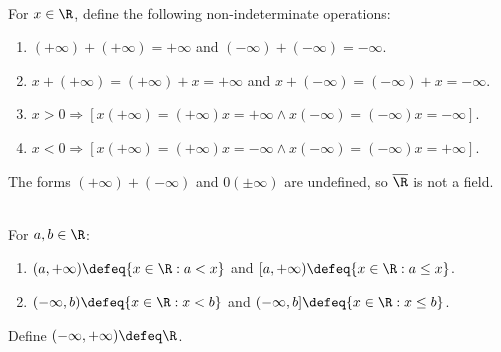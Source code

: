 \begin{definition} \label{def:extended-real-arithmetic-conventions} \\
For $x\in\R$, define the following non-indeterminate operations:
\begin{enumerate}[label=(\roman*)]
\setlength{\itemsep}{0pt}
\item $(+\infty)+(+\infty)=+\infty$ and $(-\infty)+(-\infty)=-\infty$.
\item $x+(+\infty)=(+\infty)+x=+\infty$ and $x+(-\infty)=(-\infty)+x=-\infty$.
\item $x>0\Rightarrow[x(+\infty)=(+\infty)x=+\infty\land x(-\infty)=(-\infty)x=-\infty]$.
\item $x<0\Rightarrow[x(+\infty)=(+\infty)x=-\infty\land x(-\infty)=(-\infty)x=+\infty]$.
\end{enumerate}
The forms $(+\infty)+(-\infty)$ and $0(\pm\infty)$ are undefined, so $\overline{\R}$ is not a field.
\end{definition}

\begin{definition} \label{def:unbounded-real-intervals} \\
For $a,b\in\R$:
\begin{enumerate}[label=(\roman*)]
\setlength{\itemsep}{0pt}
\item $(a,+\infty)\defeq\{x\in\R:a<x\}$ and $[a,+\infty)\defeq\{x\in\R:a\leq x\}$.
\item $(-\infty,b)\defeq\{x\in\R:x<b\}$ and $(-\infty,b]\defeq\{x\in\R:x\leq b\}$.
\end{enumerate}
Define $(-\infty,+\infty)\defeq\R$.
\end{definition}
